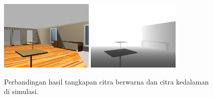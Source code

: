 \begin{figure}[ht]
  \centering
  \includegraphics[width=0.4\textwidth,keepaspectratio]{gambar/citra-depth-camera-rgb-simulasi.png}
  \includegraphics[width=0.4\textwidth,keepaspectratio]{gambar/citra-depth-camera-depth-simulasi.png}
  \caption{Perbandingan hasil tangkapan citra berwarna dan citra kedalaman di simulasi.}
  \label{fig:depthcamerasimulasi}
\end{figure}
